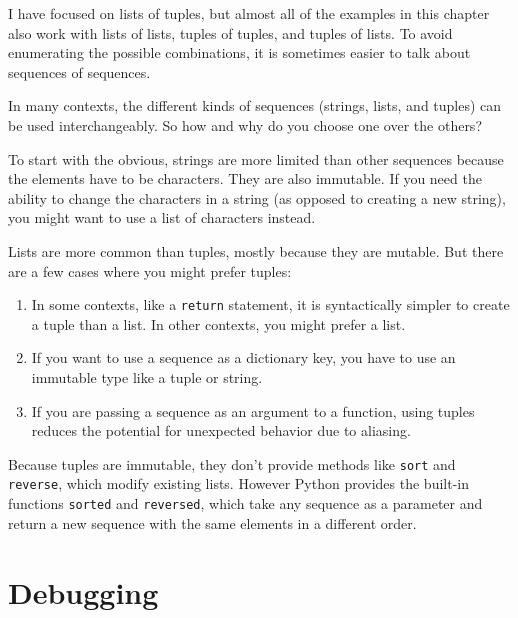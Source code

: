 I have focused on lists of tuples, but almost all of the examples in
this chapter also work with lists of lists, tuples of tuples, and
tuples of lists.  To avoid enumerating the possible combinations, it
is sometimes easier to talk about sequences of sequences.

In many contexts, the different kinds of sequences (strings, lists, and
tuples) can be used interchangeably.  So how and why do you choose one
over the others?


To start with the obvious, strings are more limited than other
sequences because the elements have to be characters.  They are
also immutable.  If you need the ability to change the characters
in a string (as opposed to creating a new string), you might
want to use a list of characters instead.

Lists are more common than tuples, mostly because they are mutable.
But there are a few cases where you might prefer tuples:

\begin{enumerate}

\item In some contexts, like a {\tt return} statement, it is
syntactically simpler to create a tuple than a list.  In other
contexts, you might prefer a list.

\item If you want to use a sequence as a dictionary key, you
have to use an immutable type like a tuple or string.

\item If you are passing a sequence as an argument to a function,
using tuples reduces the potential for unexpected behavior
due to aliasing.

\end{enumerate}

Because tuples are immutable, they don't provide methods
like {\tt sort} and {\tt reverse}, which modify existing lists.
However Python provides the built-in functions {\tt sorted}
and {\tt reversed}, which take any sequence as a parameter
and return a new sequence with the same elements in a different
order.



\section{Debugging}

